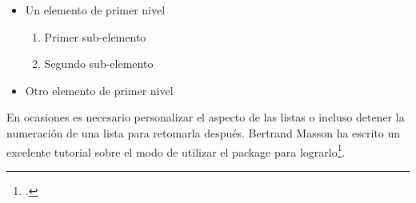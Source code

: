 \begin{quotation*}
\begin{itemize}
   \item Un elemento de primer nivel
    \begin{enumerate}
            \item Primer sub-elemento
            \item Segundo sub-elemento
    \end{enumerate}
    \item Otro elemento de primer nivel
\end{itemize}
\end{quotation*}

\begin{plusloins}
En ocasiones es necesario personalizar el aspecto de las listas o incluso detener la numeración de una lista para retomarla después. Bertrand Masson ha escrito un excelente tutorial sobre el modo de utilizar el package  para lograrlo\footcite{bebert_liste}. 
\end{plusloins}
